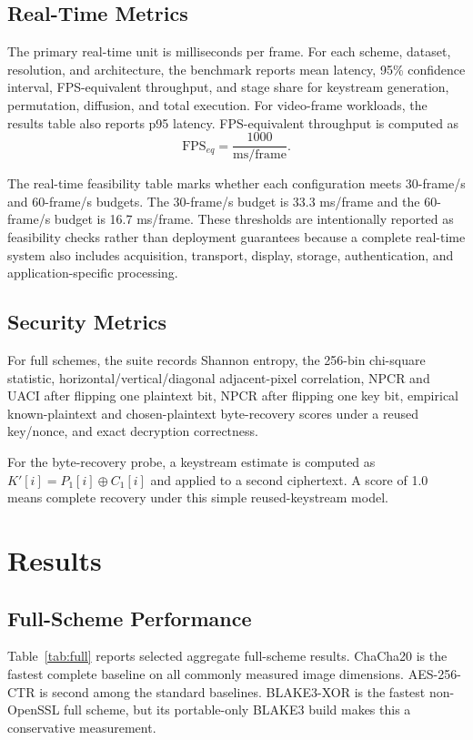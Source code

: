 \documentclass[twocolumn,runningheads]{svjour3}
\begin{document}
\subsection{Real-Time Metrics}
The primary real-time unit is milliseconds per frame. For each scheme,
dataset, resolution, and architecture, the benchmark reports mean latency,
95\% confidence interval, FPS-equivalent throughput, and stage share for
keystream generation, permutation, diffusion, and total execution. For
video-frame workloads, the results table also reports p95 latency.
FPS-equivalent throughput is computed as
\begin{equation}
\mathrm{FPS}_{eq} =
\frac{1000}{\mathrm{ms/frame}}.
\label{eq:fps}
\end{equation}

The real-time feasibility table marks whether each configuration meets
30-frame/s and 60-frame/s budgets. The 30-frame/s budget is 33.3 ms/frame and
the 60-frame/s budget is 16.7 ms/frame. These thresholds are intentionally
reported as feasibility checks rather than deployment guarantees because a
complete real-time system also includes acquisition, transport, display,
storage, authentication, and application-specific processing.

\subsection{Security Metrics}
For full schemes, the suite records Shannon entropy, the 256-bin chi-square
statistic, horizontal/vertical/diagonal adjacent-pixel correlation, NPCR and
UACI after flipping one plaintext bit, NPCR after flipping one key bit,
empirical known-plaintext and chosen-plaintext byte-recovery scores under a
reused key/nonce, and exact decryption correctness.

For the byte-recovery probe, a keystream estimate is computed as
$K'[i]=P_1[i]\oplus C_1[i]$ and applied to a second ciphertext. A score of
1.0 means complete recovery under this simple reused-keystream model.

\section{Results}
\label{sec:results}

\subsection{Full-Scheme Performance}
Table~\ref{tab:full} reports selected aggregate full-scheme results. ChaCha20
is the fastest complete baseline on all commonly measured image dimensions.
AES-256-CTR is second among the standard baselines. BLAKE3-XOR is the fastest
non-OpenSSL full scheme, but its portable-only BLAKE3 build makes this a
conservative measurement.
\end{document}
